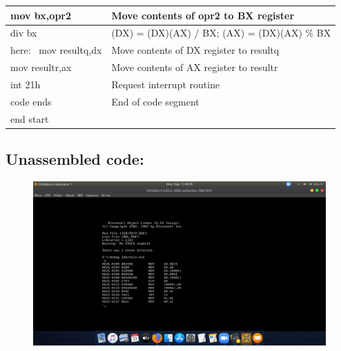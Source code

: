 \documentclass[12pt,a4paper]{article}
\begin{document}
\begin{flushleft}
\begin{table}[htb]
{\begin{tabular}{|l|l|}
\hline
mov bx,opr2                                                      & Move contents of opr2 to BX register          \\ 
\hline
div bx                                                           & (DX) = (DX)(AX) / BX; (AX) = (DX)(AX) \% BX   \\ 
\hline
here:~ mov resultq,dx                                            & Move contents of DX register to resultq       \\ 
\hline
mov resultr,ax                                                   & Move contents of AX register to resultr       \\ 
\hline
int 21h                                                          & Request interrupt routine                     \\ 
\hline
code ends                                                        & End of code segment                           \\
\hline
end start                                                        &                                               \\
\hline
\end{tabular}
}
\end{table}

\newpage
\subsection*{\textbf{Unassembled code:}}
\begin{figure}[h]
    \centering
    \includegraphics[trim = 100mm 60mm 150mm 127mm, clip, width = \textwidth]{Pics/DivisionUS.png}
\end{figure}

\end{flushleft}
\end{document}
